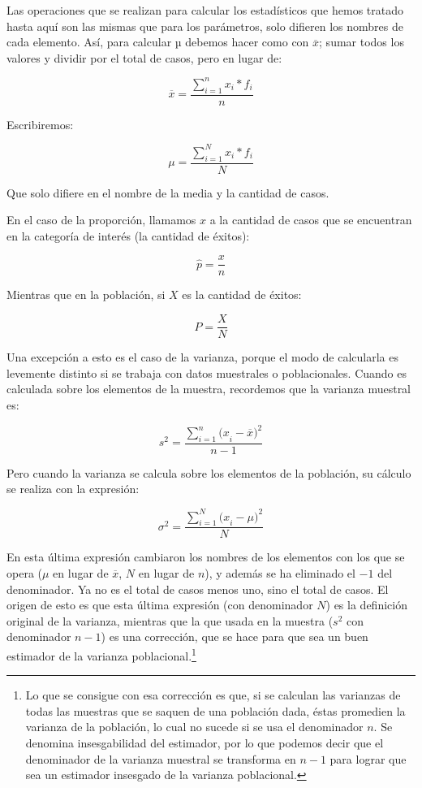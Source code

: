 \documentclass[]{book}
\let\rmarkdownfootnote\footnote%
\def\footnote{\protect\rmarkdownfootnote}
\begin{document}
Las operaciones que se realizan para calcular los estadísticos que hemos
tratado hasta aquí son las mismas que para los parámetros, solo difieren
los nombres de cada elemento. Así, para calcular µ debemos hacer como
con \(\overline{x}\); sumar todos los valores y dividir por el total de
casos, pero en lugar de:

\[\overline{x} = \frac{\sum_{i = 1}^{n}{x_{i}*f_{i}}}{n}\]

Escribiremos:

\[\mu = \frac{\sum_{i = 1}^{N}{x_{i}*f_{i}}}{N}\]

Que solo difiere en el nombre de la media y la cantidad de casos.

En el caso de la proporción, llamamos \(x\) a la cantidad de casos que se
encuentran en la categoría de interés (la cantidad de éxitos):

\[\widehat{p} = \frac{x}{n}\]

Mientras que en la población, si \(X\) es la cantidad de éxitos:

\[P = \frac{X}{N}\]

Una excepción a esto es el caso de la varianza, porque el modo de
calcularla es levemente distinto si se trabaja con datos muestrales o
poblacionales. Cuando es calculada sobre los elementos de la muestra, recordemos que la varianza muestral es:

\[s^{2} = \frac{\sum_{i = 1}^{n}{{(x}_{i} - \overline{x})}^{2}}{n - 1}\]

Pero cuando la varianza se calcula sobre los elementos de la población,
su cálculo se realiza con la expresión:

\[\sigma^{2} = \frac{\sum_{i = 1}^{N}{{(x}_{i} - \mu)}^{2}}{N}\]

En esta última expresión cambiaron los nombres de los elementos con los
que se opera (\(\mu\) en lugar de \(\overline{x}\), \(N\) en lugar de \(n\)), y
además se ha eliminado el \(-1\) del denominador. Ya no es el total de casos menos uno, sino el total de casos. El origen de esto es que esta última expresión (con denominador \(N\)) es la definición original de la varianza, mientras que la que usada en la muestra (\(s^2\) con denominador \(n-1\)) es una corrección, que se hace para que sea un buen estimador de la varianza poblacional.\footnote{Lo que se consigue con esa corrección es que, si se calculan las varianzas de todas las muestras que se saquen de una población dada, éstas promedien la varianza de la población, lo cual no sucede si se usa el denominador \(n\). Se denomina insesgabilidad del estimador, por lo que podemos decir que el denominador de la varianza muestral se transforma en \(n-1\) para lograr que sea un estimador insesgado de la varianza poblacional.}
\end{document}

